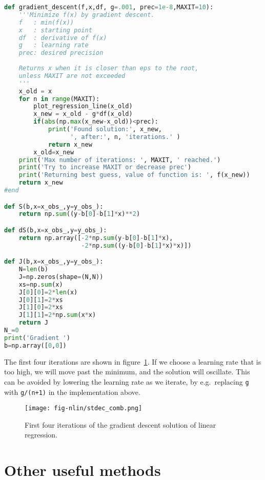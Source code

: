 \documentclass[graybox,sectrefs,envcountresetchap,open=right,final]{svmonodo}
\newenvironment{doconceexercise}{}{}
\begin{document}
\begin{doconceexercise}
\begin{lstlisting}[language=python,style=blue1]
def gradient_descent(f,x,df, g=.001, prec=1e-8,MAXIT=10):
    '''Minimize f(x) by gradient descent.
    f   : min(f(x))
    x   : starting point 
    df  : derivative of f(x)
    g   : learning rate
    prec: desired precision
    
    Returns x when it is closer than eps to the root, 
    unless MAXIT are not exceeded
    '''
    x_old = x
    for n in range(MAXIT):
        plot_regression_line(x_old)  
        x_new = x_old - g*df(x_old)
        if(abs(np.max(x_new-x_old))<prec):
            print('Found solution:', x_new, 
                  ', after:', n, 'iterations.' )
            return x_new
        x_old=x_new
    print('Max number of iterations: ', MAXIT, ' reached.') 
    print('Try to increase MAXIT or decrease prec')
    print('Returning best guess, value of function is: ', f(x_new))
    return x_new
#end

def S(b,x=x_obs_,y=y_obs_):
    return np.sum((y-b[0]-b[1]*x)**2)

def dS(b,x=x_obs_,y=y_obs_):
    return np.array([-2*np.sum(y-b[0]-b[1]*x),
                     -2*np.sum((y-b[0]-b[1]*x)*x)])

def J(b,x=x_obs_,y=y_obs_):
    N=len(b)
    J=np.zeros(shape=(N,N))
    xs=np.sum(x)
    J[0][0]=2*len(x)
    J[0][1]=2*xs
    J[1][0]=2*xs
    J[1][1]=2*np.sum(x*x)
    return J
N_=0
print('Gradient ')
b=np.array([0,0])

\end{lstlisting}

The first four iterations are shown in figure~\ref{fig:nlin:grsc}. If we choose a learning rate that is too high, we will move past the minimum, and the solution will oscillate. This can be avoided by lowering the learning rate as we iterate, by e.g.~replacing \texttt{g} with \texttt{g/(n+1)} in the implementation above.

\begin{figure}[!ht]  %
  \centerline{\texttt{[image: fig-nlin/stdec\_comb.png]}}
  \caption{
  First four iterations of the gradient descent solution of linear regression. \label{fig:nlin:grsc}
  }
\end{figure}


\end{doconceexercise}

\section{Other useful methods}
\end{document}
